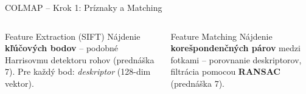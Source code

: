 \documentclass[aspectratio=169]{beamer}
\newcommand{\highlight}[1]{\textcolor{pvsoBlue}{\textbf{#1}}}
\begin{document}
\begin{frame}{COLMAP – Krok 1: Príznaky a Matching}
\vspace{0.04cm}
\begin{columns}[t]
\begin{block}{Feature Extraction (SIFT)}
{\small Nájdenie \highlight{kľúčových bodov} – podobné Harrisovmu detektoru rohov (prednáška 7).
Pre každý bod: \textit{deskriptor} (128-dim vektor).}
\end{block}

\begin{block}{Feature Matching}
{\small Nájdenie \highlight{korešpondenčných párov} medzi fotkami – porovnanie deskriptorov,
filtrácia pomocou \textbf{RANSAC} (prednáška 7).}
\end{block}
\end{columns}

\end{frame}
\end{document}
